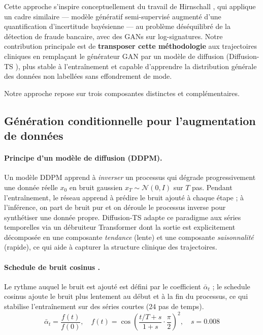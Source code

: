 \documentclass[11pt,a4paper]{article}
\begin{document}
Cette approche s'inspire conceptuellement du travail de Hirnschall \cite{hirnschall2025},
qui applique un cadre similaire --- modèle génératif semi-supervisé augmenté d'une
quantification d'incertitude bayésienne --- au problème déséquilibré de la détection
de fraude bancaire, avec des GANs sur log-signatures. Notre contribution principale est
de \textbf{transposer cette méthodologie} aux trajectoires cliniques en remplaçant
le générateur GAN par un modèle de diffusion (Diffusion-TS \cite{diffusion-ts}), plus
stable à l'entraînement et capable d'apprendre la distribution générale des données
non labellées sans effondrement de mode.

Notre approche repose sur trois composantes distinctes et complémentaires.

\subsection{Génération conditionnelle pour l'augmentation de données}

\paragraph{Principe d'un modèle de diffusion (DDPM).}
Un modèle DDPM apprend à \emph{inverser} un processus qui dégrade progressivement une
donnée réelle $x_0$ en bruit gaussien $x_T \sim \mathcal{N}(0, I)$ sur $T$ pas. Pendant
l'entraînement, le réseau apprend à prédire le bruit ajouté à chaque étape ; à l'inférence,
on part de bruit pur et on déroule le processus inverse pour synthétiser une donnée
propre. Diffusion-TS \cite{diffusion-ts} adapte ce paradigme aux séries temporelles via
un débruiteur Transformer dont la sortie est explicitement décomposée en une composante
\emph{tendance} (lente) et une composante \emph{saisonnalité} (rapide), ce qui aide
à capturer la structure clinique des trajectoires.

\paragraph{Schedule de bruit cosinus \cite{nichol2021improved}.}
Le rythme auquel le bruit est ajouté est défini par le coefficient $\bar{\alpha}_t$ ;
le schedule cosinus ajoute le bruit plus lentement au début et à la fin du processus,
ce qui stabilise l'entraînement sur des séries courtes (24 pas de temps).
\[
\bar{\alpha}_t = \frac{f(t)}{f(0)}, \quad
f(t) = \cos\!\left(\frac{t/T + s}{1+s} \cdot \frac{\pi}{2}\right)^2, \quad s = 0.008
\]
\end{document}
